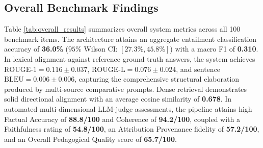 \documentclass[conference]{IEEEtran}
\begin{document}
\subsection{Overall Benchmark Findings}
Table \ref{tab:overall_results} summarizes overall system metrics across all 100 benchmark items. The architecture attains an aggregate entailment classification accuracy of \textbf{36.0\%} ($95\%$ Wilson CI: $[27.3\%, 45.8\%]$) with a macro F1 of \textbf{0.310}. In lexical alignment against reference ground truth answers, the system achieves $\text{ROUGE-1} = 0.116 \pm 0.037$, $\text{ROUGE-L} = 0.076 \pm 0.024$, and sentence $\text{BLEU} = 0.006 \pm 0.006$, capturing the comprehensive structural elaboration produced by multi-source comparative prompts. Dense retrieval demonstrates solid directional alignment with an average cosine similarity of \textbf{0.678}. In automated multi-dimensional LLM-judge assessments, the pipeline attains high Factual Accuracy of \textbf{88.8/100} and Coherence of \textbf{94.2/100}, coupled with a Faithfulness rating of \textbf{54.8/100}, an Attribution Provenance fidelity of \textbf{57.2/100}, and an Overall Pedagogical Quality score of \textbf{65.7/100}.

\begin{table}[htbp]
\caption{Overall Quantitative Performance on 100-Question Benchmark}
\label{tab:overall_results}
\centering
{}
\end{table}
\end{document}
